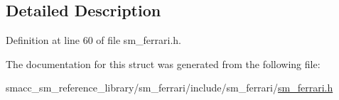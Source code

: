 \subsection{Detailed Description}


Definition at line 60 of file sm\+\_\+ferrari.\+h.



The documentation for this struct was generated from the following file\+:\begin{DoxyCompactItemize}
\item 
smacc\+\_\+sm\+\_\+reference\+\_\+library/sm\+\_\+ferrari/include/sm\+\_\+ferrari/\hyperlink{sm__ferrari_8h}{sm\+\_\+ferrari.\+h}\end{DoxyCompactItemize}
